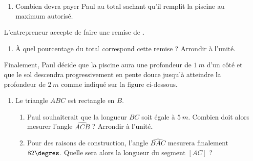 \documentclass[12pt,french]{article}
\begin{document}
    \begin{enumerate}[resume]
        \item Combien devra payer Paul au total sachant qu'il remplit la piscine au maximum autorisé.
    \end{enumerate}
    
    L'entrepreneur accepte de faire une remise de .
    
    \begin{enumerate}[resume]
        \item À quel pourcentage du total correspond cette remise ? Arrondir à l'unité.
    \end{enumerate}
    
    Finalement, Paul décide que la piscine aura une profondeur de $1~m$ d'un côté et que le sol descendra progressivement en pente douce jusqu'à atteindre la profondeur de $2~m$ comme indiqué sur la figure ci-dessous.\medskip
    
    \begin{center}
    \end{center}
    
    \begin{enumerate}[resume]
        \item Le triangle $ABC$ est rectangle en $B$.
                \begin{enumerate}
                    \item Paul souhaiterait que la longueur $BC$ soit égale à $5~m$. Combien doit alors mesurer l'angle $\widehat{ACB}$ ? Arrondir à l'unité.
                    \item Pour des raisons de construction, l'angle $\widehat{BAC}$ mesurera finalement $82\degres$. Quelle sera alors la longueur du segment $[AC]$ ?
                \end{enumerate}
    \end{enumerate}
\end{document}
